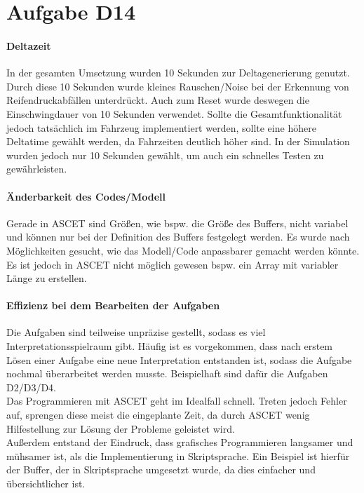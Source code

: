 \chapter{Aufgabe D14}
\subsubsection{Deltazeit}
In der gesamten Umsetzung wurden 10 Sekunden zur Deltagenerierung genutzt. Durch diese 10 Sekunden wurde kleines Rauschen/Noise bei der Erkennung von Reifendruckabfällen unterdrückt. Auch zum Reset wurde deswegen die Einschwingdauer von 10 Sekunden verwendet.
Sollte die Gesamtfunktionalität jedoch tatsächlich im Fahrzeug implementiert werden, sollte eine höhere Deltatime gewählt werden, da Fahrzeiten deutlich höher sind. In der Simulation wurden jedoch nur 10 Sekunden gewählt, um auch ein schnelles Testen zu gewährleisten.

\subsubsection{Änderbarkeit des Codes/Modell}
Gerade in ASCET sind Größen, wie bspw. die Größe des Buffers, nicht variabel und können nur bei der Definition des Buffers festgelegt werden. Es wurde nach Möglichkeiten gesucht, wie das Modell/Code anpassbarer gemacht werden könnte. Es ist jedoch in ASCET nicht möglich gewesen bspw. ein Array mit variabler Länge zu erstellen. 

\subsubsection{Effizienz bei dem Bearbeiten der Aufgaben}
Die Aufgaben sind teilweise unpräzise gestellt, sodass es viel Interpretationsspielraum gibt. Häufig ist es vorgekommen, dass nach erstem Lösen einer Aufgabe eine neue Interpretation entstanden ist, sodass die Aufgabe nochmal überarbeitet werden musste. Beispielhaft sind dafür die Aufgaben D2/D3/D4.\\
Das Programmieren mit ASCET geht im Idealfall schnell. Treten jedoch Fehler auf, sprengen diese meist die eingeplante Zeit, da durch ASCET wenig Hilfestellung zur Lösung der Probleme geleistet wird.\\
Außerdem entstand der Eindruck, dass grafisches Programmieren langsamer und mühsamer ist, als die Implementierung in Skriptsprache. Ein Beispiel ist hierfür der Buffer, der in Skriptsprache umgesetzt wurde, da dies einfacher und übersichtlicher ist.\\